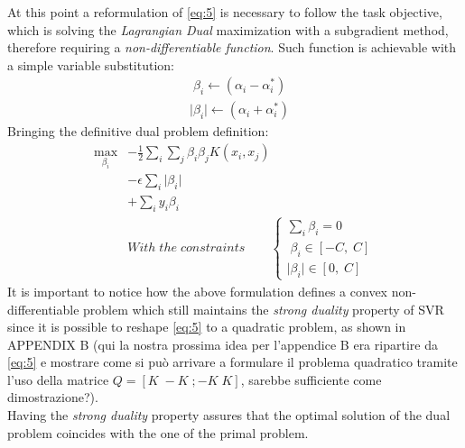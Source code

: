 \documentclass[12pt]{article}
\newcommand{\abs}[1]{\lvert#1\rvert}
\begin{document}
	At this point a reformulation of \eqref{eq:5} is necessary to follow the task objective, which is solving the \textit{Lagrangian Dual} maximization with a subgradient method, therefore requiring a \textit{non-differentiable function}. Such function is achievable with a simple variable substitution:
	\begin{equation*}
	    \begin{aligned}
	    &\;\beta_i \longleftarrow (\alpha_i - \alpha_i^*) \\
	    &\abs{\beta_i} \longleftarrow (\alpha_i + \alpha_i^*)
	    \end{aligned}
	\end{equation*}
	Bringing the definitive dual problem definition:
	\begin{equation}\label{eq:7}
	    \begin{aligned}
	    \max_{\beta_i} &- \frac{1}{2}\sum_i \sum_j \beta_i \beta_j K(x_i,x_j) \\
		&- \epsilon\sum_i\abs{\beta_i}\\
		&+ \sum_i y_i\beta_i\\
		&With\;the\;constraints\qquad
        \begin{cases}
            \sum_i \beta_i = 0 \\
            \;\beta_i\in[-C,\;C] \\
            \abs{\beta_i}\in[0,\;C]
        \end{cases}
        \end{aligned}
	\end{equation}
	It is important to notice how the above formulation defines a convex non-differentiable problem which still maintains the \textit{strong duality} property of SVR since it is possible to reshape \eqref{eq:5} to a quadratic problem, as shown in APPENDIX B (qui la nostra prossima idea per l'appendice B era ripartire da \eqref{eq:5} e mostrare come si può arrivare a formulare il problema quadratico tramite l'uso della matrice $Q=[K\;-K\; ; -K \; K]$, sarebbe sufficiente come dimostrazione?).\\
	Having the \textit{strong duality} property assures that the optimal solution of the dual problem coincides with the one of the primal problem. 





    \pagebreak
\end{document}
